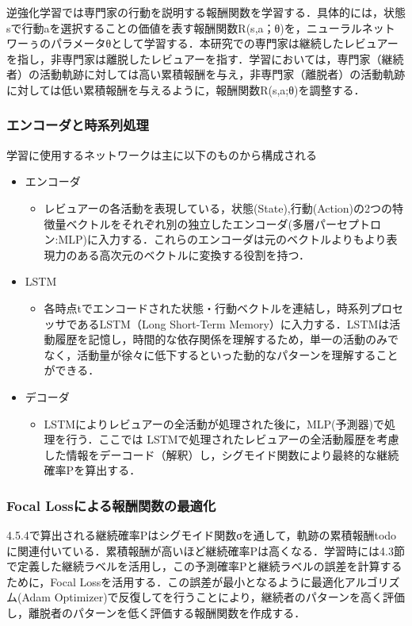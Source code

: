 \documentclass[submit,techrep,noauthor]{ipsj}
\begin{document}
逆強化学習では専門家の行動を説明する報酬関数を学習する．具体的には，状態sで行動aを選択することの価値を表す報酬関数R(s,a；θ)を，ニューラルネットワーぅのパラメータθとして学習する．本研究での専門家は継続したレビュアーを指し，非専門家は離脱したレビュアーを指す．学習においては，専門家（継続者）の活動軌跡に対しては高い累積報酬を与え，非専門家（離脱者）の活動軌跡に対しては低い累積報酬を与えるように，報酬関数R(s,a;θ)を調整する．



\subsubsection{エンコーダと時系列処理}
学習に使用するネットワークは主に以下のものから構成される
\begin{itemize}
    \item エンコーダ
    \begin{itemize}
        \item レビュアーの各活動を表現している，状態(State),行動(Action)の2つの特徴量ベクトルをそれぞれ別の独立したエンコーダ(多層パーセプトロン:MLP)に入力する．これらのエンコーダは元のベクトルよりもより表現力のある高次元のベクトルに変換する役割を持つ．
    \end{itemize}
    \item LSTM
        \begin{itemize}
    \item 各時点tでエンコードされた状態・行動ベクトルを連結し，時系列プロセッサであるLSTM（Long Short-Term Memory）に入力する．LSTMは活動履歴を記憶し，時間的な依存関係を理解するため，単一の活動のみでなく，活動量が徐々に低下するといった動的なパターンを理解することができる．
    \end{itemize}
    \item デコーダ
    \begin{itemize}
        \item  LSTMによりレビュアーの全活動が処理された後に，MLP(予測器)で処理を行う．ここでは LSTMで処理されたレビュアーの全活動履歴を考慮した情報をデーコード（解釈）し，シグモイド関数により最終的な継続確率Pを算出する．
    \end{itemize}
\end{itemize}
\subsubsection{Focal Lossによる報酬関数の最適化}
4.5.4で算出される継続確率Pはシグモイド関数σを通して，軌跡の累積報酬todoに関連付いている．累積報酬が高いほど継続確率Pは高くなる．学習時には4.3節で定義した継続ラベルを活用し，この予測確率Pと継続ラベルの誤差を計算するために，Focal Lossを活用する．この誤差が最小となるように最適化アルゴリズム(Adam Optimizer)で反復してを行うことにより，継続者のパターンを高く評価し，離脱者のパターンを低く評価する報酬関数を作成する．
\end{document}
